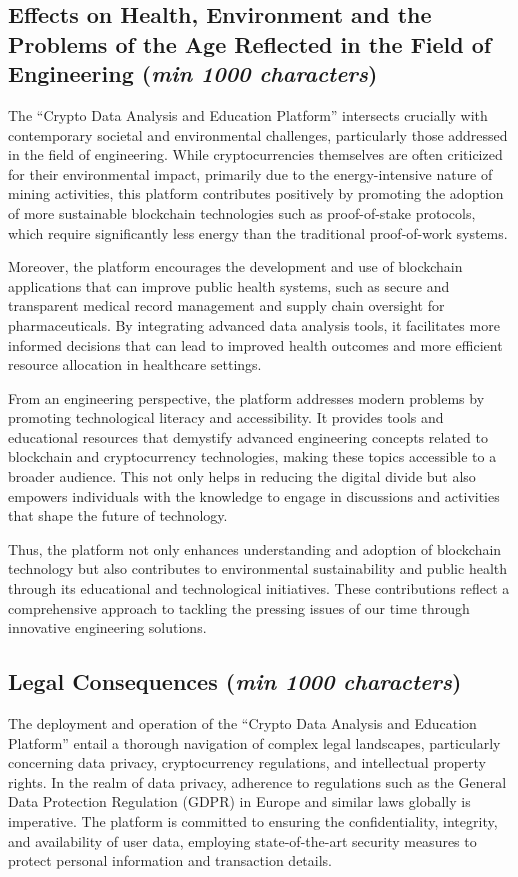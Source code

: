 \documentclass[12pt]{report}
\newcommand{\characters}[1]{(\textit{min #1 characters})}
\begin{document}
\subsection{Effects on Health, Environment and the Problems of the Age Reflected in the Field of Engineering \characters{1000}}
The ``Crypto Data Analysis and Education Platform'' intersects crucially with contemporary societal and environmental challenges, particularly those addressed in the field of engineering. While cryptocurrencies themselves are often criticized for their environmental impact, primarily due to the energy-intensive nature of mining activities, this platform contributes positively by promoting the adoption of more sustainable blockchain technologies such as proof-of-stake protocols, which require significantly less energy than the traditional proof-of-work systems.

Moreover, the platform encourages the development and use of blockchain applications that can improve public health systems, such as secure and transparent medical record management and supply chain oversight for pharmaceuticals. By integrating advanced data analysis tools, it facilitates more informed decisions that can lead to improved health outcomes and more efficient resource allocation in healthcare settings.

From an engineering perspective, the platform addresses modern problems by promoting technological literacy and accessibility. It provides tools and educational resources that demystify advanced engineering concepts related to blockchain and cryptocurrency technologies, making these topics accessible to a broader audience. This not only helps in reducing the digital divide but also empowers individuals with the knowledge to engage in discussions and activities that shape the future of technology.

Thus, the platform not only enhances understanding and adoption of blockchain technology but also contributes to environmental sustainability and public health through its educational and technological initiatives. These contributions reflect a comprehensive approach to tackling the pressing issues of our time through innovative engineering solutions.

\subsection{Legal Consequences \characters{1000}}
The deployment and operation of the ``Crypto Data Analysis and Education Platform'' entail a thorough navigation of complex legal landscapes, particularly concerning data privacy, cryptocurrency regulations, and intellectual property rights. In the realm of data privacy, adherence to regulations such as the General Data Protection Regulation (GDPR) in Europe and similar laws globally is imperative. The platform is committed to ensuring the confidentiality, integrity, and availability of user data, employing state-of-the-art security measures to protect personal information and transaction details.
\end{document}
